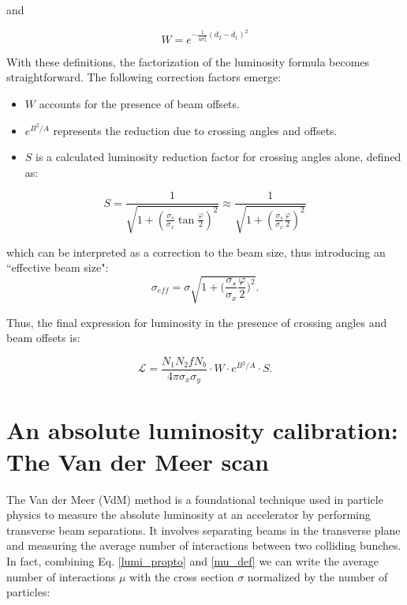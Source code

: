 and 

\begin{equation}
    W = e^{-\frac{1}{4\sigma_x^2}(d_2-d_1)^2}
\end{equation}

With these definitions, the factorization of the luminosity formula becomes straightforward. The following correction factors emerge:
\begin{itemize}
\item $W$ accounts for the presence of beam offsets.
\item $e^{B^2/A}$ represents the reduction due to crossing angles and offsets.
\item $S$ is a calculated luminosity reduction factor for crossing angles alone, defined as:
\end{itemize}

\begin{equation}
  S = \frac{1}{\sqrt{1 + \left( \frac{\sigma_s}{\sigma_x} \tan \frac{\varphi}{2} \right)^2}} \approx \frac{1}{\sqrt{1 + \left( \frac{\sigma_s}{\sigma_x} \frac{\varphi}{2} \right)^2}}
\end{equation}

which can be interpreted as a correction to the beam size, thus introducing an ``effective beam size":
\begin{equation}
    \sigma_{eff} = \sigma \sqrt{1+\biggl(\frac{\sigma_s}{\sigma_x}\frac{\varphi}{2}\biggr)^2}.
\end{equation}

Thus, the final expression for luminosity in the presence of crossing angles and beam offsets is:

\begin{equation}
\mathcal{L} = \frac{N_1  N_2  f  N_b}{4 \pi  \sigma_x  \sigma_y} \cdot W \cdot e^{B^2/A} \cdot S.
\end{equation}

\section{An absolute luminosity calibration: The Van der Meer scan}
The Van der Meer (VdM) method is a foundational technique used in particle physics to measure the absolute luminosity at an accelerator by performing transverse beam separations. It involves separating beams in the transverse plane and measuring the average number of interactions between two colliding bunches. 
In fact, combining Eq. \ref{lumi_propto} and \ref{mu_def} we can write the  average number of interactions $\mu$  with the cross section $\sigma$ normalized by the number of particles:

